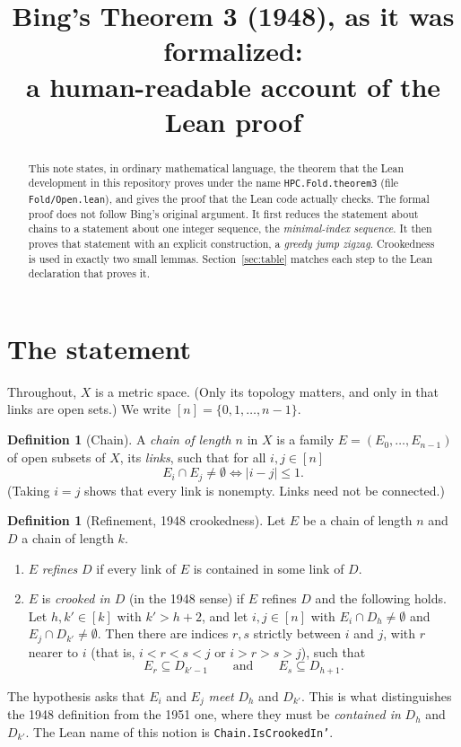 \documentclass[11pt]{article}
\title{Bing's Theorem 3 (1948), as it was formalized:\\
a human-readable account of the Lean proof}
\author{}
\date{}
\theoremstyle{definition}
\newtheorem{definition}[theorem]{Definition}
\theoremstyle{remark}
\newcommand{\lean}[1]{\texttt{#1}}
\begin{document}
\maketitle

\begin{abstract}
This note states, in ordinary mathematical language, the theorem that the Lean
development in this repository proves under the name \lean{HPC.Fold.theorem3}
(file \lean{Fold/Open.lean}), and gives the proof that the Lean code actually
checks. The formal proof does not follow Bing's original argument. It first
reduces the statement about chains to a statement about one integer sequence,
the \emph{minimal-index sequence}. It then proves that statement with an
explicit construction, a \emph{greedy jump zigzag}. Crookedness is used in
exactly two small lemmas. Section~\ref{sec:table} matches each step to the Lean
declaration that proves it.
\end{abstract}

\tableofcontents

\section{The statement}

Throughout, $X$ is a metric space. (Only its topology matters, and only in
that links are open sets.) We write $[n]=\{0,1,\dots,n-1\}$.

\begin{definition}[Chain]\label{def:chain}
A \emph{chain of length $n$} in $X$ is a family $E=(E_0,\dots,E_{n-1})$ of open
subsets of $X$, its \emph{links}, such that for all $i,j\in[n]$
\[
E_i\cap E_j\neq\emptyset \iff |i-j|\le 1 .
\]
(Taking $i=j$ shows that every link is nonempty. Links need not be connected.)
\end{definition}

\begin{definition}[Refinement, 1948 crookedness]\label{def:crooked}
Let $E$ be a chain of length $n$ and $D$ a chain of length $k$.
\begin{enumerate}[label=(\alph*)]
\item $E$ \emph{refines} $D$ if every link of $E$ is contained in some link of $D$.
\item $E$ is \emph{crooked in $D$} (in the 1948 sense) if $E$ refines $D$ and the
following holds. Let $h,k'\in[k]$ with $k'>h+2$, and let $i,j\in[n]$ with
$E_i\cap D_h\neq\emptyset$ and $E_j\cap D_{k'}\neq\emptyset$. Then there are
indices $r,s$ strictly between $i$ and $j$, with $r$ nearer to $i$ (that is,
$i<r<s<j$ or $i>r>s>j$), such that
\[
E_r\subseteq D_{k'-1}\qquad\text{and}\qquad E_s\subseteq D_{h+1}.
\]
\end{enumerate}
The hypothesis asks that $E_i$ and $E_j$ \emph{meet} $D_h$ and $D_{k'}$. This is
what distinguishes the 1948 definition from the 1951 one, where they must be
\emph{contained in} $D_h$ and $D_{k'}$. The Lean name of this notion is
\lean{Chain.IsCrookedIn'}.
\end{definition}
\end{document}
